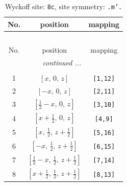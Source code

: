 \documentclass[fleqn,8pt]{jsarticle}
\begin{document}
\renewcommand{\arraystretch}{1.2}
\begin{longtable}{ccc}
\caption{Wyckoff site: {\tt 8c}, site symmetry: {\tt .m'.}}
 \\
 \hline \hline
No. & position & mapping \\ \hline \endfirsthead

\multicolumn{2}{l}{\tablename\ \thetable{}} \\
 \hline \hline
No. & position & mapping \\ \hline \endhead

 \hline \hline
\multicolumn{2}{r}{\footnotesize\it continued ...} \\ \endfoot

 \hline \hline
\multicolumn{2}{r}{} \\ \endlastfoot

1 & $\left[ x,\, 0,\, z \right]$ & {\tt [1,12]} \\ \hline
2 & $\left[ - x,\, 0,\, z \right]$ & {\tt [2,11]} \\ \hline
3 & $\left[ \frac{1}{2} - x,\, 0,\, z \right]$ & {\tt [3,10]} \\ \hline
4 & $\left[ x + \frac{1}{2},\, 0,\, z \right]$ & {\tt [4,9]} \\ \hline
5 & $\left[ x,\, \frac{1}{2},\, z + \frac{1}{2} \right]$ & {\tt [5,16]} \\ \hline
6 & $\left[ - x,\, \frac{1}{2},\, z + \frac{1}{2} \right]$ & {\tt [6,15]} \\ \hline
7 & $\left[ \frac{1}{2} - x,\, \frac{1}{2},\, z + \frac{1}{2} \right]$ & {\tt [7,14]} \\ \hline
8 & $\left[ x + \frac{1}{2},\, \frac{1}{2},\, z + \frac{1}{2} \right]$ & {\tt [8,13]} \\
\end{longtable}
\renewcommand{\arraystretch}{1.2}
\end{document}
